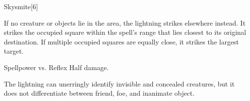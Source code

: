 \begin{spellsection}{Skysmite}[6]
    \begin{spellheader}
    \end{spellheader}
    \begin{spellcontent}
        \begin{spelltargetinginfo}
            \spellrng{\rngext}
            \spellspecial If no creature or objects lie in the area, the lightning strikes elsewhere instead. It strikes the occupied square within the spell's range that lies closest to its original destination. If multiple occupied squares are equally close, it strikes the largest target.
        \end{spelltargetinginfo}
        \begin{spelleffects}
            \begin{spellattack}{Spellpower vs. Reflex}
                \spellsuccess {}
                \spellfailure Half damage.
            \end{spellattack}
        \end{spelleffects}
    \end{spellcontent}
    \begin{spellfooter}
        \spellnotes The lightning can unerringly identify invisible and concealed creatures, but it does not differentiate between friend, foe, and inanimate object.
        \miscastexplode
    \end{spellfooter}
\end{spellsection}

